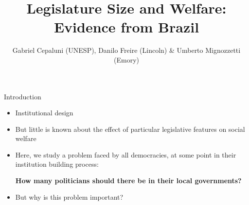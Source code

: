 \documentclass[11pt]{beamer}
\begin{document}
\title{Legislature Size and Welfare: \\ Evidence from Brazil}
\author[Mignozzetti, Cepaluni, Freire]{{Gabriel Cepaluni (UNESP), Danilo Freire (Lincoln) \& Umberto Mignozzetti (Emory)}}
\date{}

\begin{frame}
\maketitle
\end{frame}

\pagebreak

\begin{frame}{Introduction}
  \begin{itemize} \itemsep1em
   \item Institutional design 
   \item But little is known about the effect of particular legislative features on social welfare
   \item Here, we study a problem faced by all democracies, at some point in their institution building process: 
   
   \vspace{0.15in}
   
   \textbf{How many politicians should there be in their local governments?}
   
   \item But why is this problem important?
  \end{itemize}
\end{frame}
\end{document}
